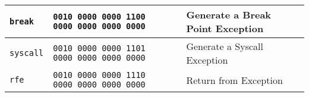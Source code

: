 \documentclass[12pt]{report}
\begin{document}
\begin{center}
\begin{tabular}{|l|l|l|p{5.5cm}|}
  \scriptsize{ \texttt{break} }
  &
  \scriptsize{\texttt{0010 0000 0000 1100 0000 0000 0000 0000}}
  &
  &
  \scriptsize{ Generate a Break Point Exception }
  \\
  \hline


  \scriptsize{ \texttt{syscall} }
  &
  \scriptsize{\texttt{0010 0000 0000 1101 0000 0000 0000 0000}}
  &
  &
  \scriptsize{ Generate a Syscall Exception }
  \\
  \hline


  \scriptsize{ \texttt{rfe} }
  &
  \scriptsize{\texttt{0010 0000 0000 1110 0000 0000 0000 0000}}
  &
  &
  \scriptsize{ Return from Exception }
  \\
  \hline


\end{tabular}

\end{center}

\end{document}
